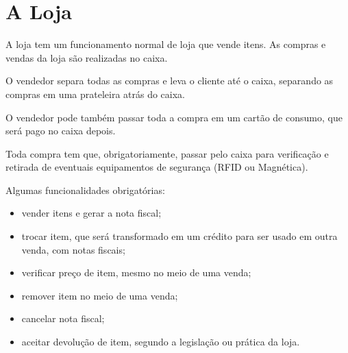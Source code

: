 \chapter{A Loja}
\label{chap:loja}

A loja tem um funcionamento normal de loja que vende itens. As compras e vendas da loja são realizadas no caixa.

O vendedor separa todas as compras e leva o cliente até o caixa, separando as compras em uma prateleira atrás do caixa.

O vendedor pode também passar toda a compra em um cartão de consumo, que será pago no caixa depois.

Toda compra tem que, obrigatoriamente, passar pelo caixa para verificação e retirada de eventuais equipamentos de segurança (RFID ou Magnética).

Algumas funcionalidades obrigatórias:
\begin{itemize}
    \item vender itens e gerar a nota fiscal;
    \item trocar item, que será transformado em um crédito para ser usado em outra venda, com notas fiscais;
    \item verificar preço de item, mesmo no meio de uma venda;
    \item remover item no meio de uma venda;
    \item cancelar nota fiscal;
    \item aceitar devolução de item, segundo a legislação ou prática da loja.
\end{itemize}


